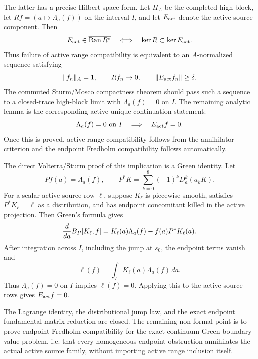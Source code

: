\documentclass[11pt]{article}
\begin{document}
The latter has a precise Hilbert-space form.  Let \(H_A\) be the completed
high block, let \(R f=(a\mapsto \Lambda_a(f))\) on the interval \(I\), and let
\(E_{\rm act}\) denote the active source component.  Then
\[
  E_{\rm act}\in\overline{{\rm Ran}\,R^\ast}
  \quad\Longleftrightarrow\quad
  \ker R\subset \ker E_{\rm act}.
\]
Thus failure of active range compatibility is equivalent to an
\(A\)-normalized sequence satisfying
\[
  \|f_n\|_A=1,\qquad Rf_n\to0,\qquad
  \|E_{\rm act}f_n\|\ge \delta .
\]
The commuted Sturm/Mosco compactness theorem should pass such a sequence to a
closed-trace high-block limit with \(\Lambda_a(f)=0\) on \(I\).  The remaining
analytic lemma is the corresponding active unique-continuation statement:
\[
  \Lambda_a(f)=0\ \text{on }I
  \quad\Longrightarrow\quad
  E_{\rm act}f=0 .
\]
Once this is proved, active range compatibility follows from the annihilator
criterion and the endpoint Fredholm compatibility follows automatically.

The direct Volterra/Sturm proof of this implication is a Green identity.  Let
\[
  P f(a)=\Lambda_a(f),\qquad
  P^\ast K=\sum_{k=0}^8(-1)^kD_a^k(a_kK).
\]
For a scalar active source row \(\ell\), suppose \(K_\ell\) is piecewise
smooth, satisfies \(P^\ast K_\ell=\ell\) as a distribution, and has endpoint
concomitant killed in the active projection.  Then Green's formula gives
\[
  {d\over da}B_P[K_\ell,f]
  =K_\ell(a)\Lambda_a(f)-f(a)P^\ast K_\ell(a).
\]
After integration across \(I\), including the jump at \(s_0\), the endpoint
terms vanish and
\[
  \ell(f)=\int_I K_\ell(a)\Lambda_a(f)\,da .
\]
Thus \(\Lambda_a(f)=0\) on \(I\) implies \(\ell(f)=0\).  Applying this to the
active source rows gives \(E_{\rm act}f=0\).

The Lagrange identity, the distributional jump law, and the exact endpoint
fundamental-matrix reduction are closed.  The remaining non-formal point is to
prove endpoint Fredholm compatibility for the exact continuum Green
boundary-value problem, i.e. that every homogeneous endpoint obstruction
annihilates the actual active source family, without importing active range
inclusion itself.
\end{document}
